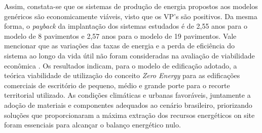 \noindent Assim, constata-se que os sistemas de produção de energia propostos aos modelos genéricos são economicamente viáveis, visto que os VP’s são positivos. Da mesma forma, o \textit{payback} da implantação dos sistemas estudados é de 2,55 anos para o modelo de 8 pavimentos e 2,57 anos para o modelo de 19 pavimentos. Vale mencionar que as variações das taxas de energia e a perda de eficiência do sistema ao longo da vida útil não foram consideradas na avaliação de viabilidade econômica \cite{Sorgato2018}.\vspace*{0.3cm} \newline
\noindent Os resultados indicam, para o modelo de edificação adotado, a teórica viabilidade de utilização do conceito \textit{Zero Energy} para as edificações comerciais de escritório de pequeno, médio e grande porte para o recorte territorial utilizado. As condições climáticas e urbanas favoráveis, juntamente a adoção de materiais e componentes adequados ao cenário brasileiro, priorizando soluções que proporcionaram a máxima extração dos recursos energéticos on site foram essenciais para alcançar o balanço energético nulo.